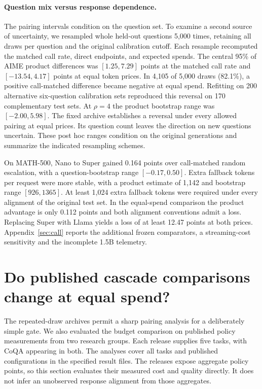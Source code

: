 \paragraph{Question mix versus response dependence.}
The pairing intervals condition on the question set. To examine a second source of uncertainty, we resampled whole held-out questions 5,000 times, retaining all draws per question and the original calibration cutoff. Each resample recomputed the matched call rate, direct endpoints, and expected spends. The central 95\% of AIME product differences was $[1.25,7.29]$ points at the matched call rate and $[-13.54,4.17]$ points at equal token prices. In 4,105 of 5,000 draws (82.1\%), a positive call-matched difference became negative at equal spend. Refitting on 200 alternative six-question calibration sets reproduced this reversal on 170 complementary test sets. At $\rho=4$ the product bootstrap range was $[-2.00,5.98]$. The fixed archive establishes a reversal under every allowed pairing at equal prices. Its question count leaves the direction on new questions uncertain. These post hoc ranges condition on the original generations and summarize the indicated resampling schemes.

On MATH-500, Nano to Super gained 0.164 points over call-matched random escalation, with a question-bootstrap range $[-0.17,0.50]$. Extra fallback tokens per request were more stable, with a product estimate of 1,142 and bootstrap range $[926,1365]$. At least 1,024 extra fallback tokens were required under every alignment of the original test set. In the equal-spend comparison the product advantage is only 0.112 points and both alignment conventions admit a loss. Replacing Super with Llama yields a loss of at least 12.47 points at both prices. Appendix~\ref{sec:call} reports the additional frozen comparators, a streaming-cost sensitivity and the incomplete 1.5B telemetry.

\section{Do published cascade comparisons change at equal spend?}
The repeated-draw archives permit a sharp pairing analysis for a deliberately simple gate. We also evaluated the budget comparison on published policy measurements from two research groups. Each release supplies five tasks, with CoQA appearing in both. The analyses cover all tasks and published configurations in the specified result files. The releases expose aggregate policy points, so this section evaluates their measured cost and quality directly. It does not infer an unobserved response alignment from those aggregates.

